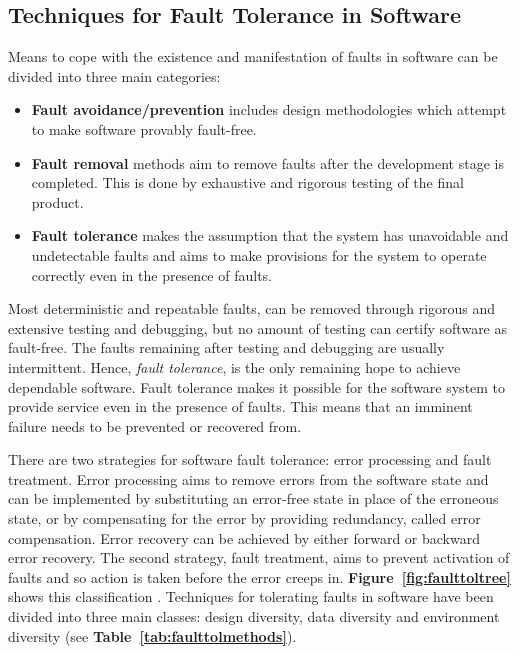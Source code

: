 \documentclass[a4paper, 11pt]{article}
\begin{document}
\subsection{Techniques for Fault Tolerance in Software}
Means to cope with the existence and manifestation of faults in software can be divided into three main categories:

\begin{itemize}
\item \textbf{Fault avoidance/prevention} includes design methodologies which attempt to make software provably fault-free.
\item \textbf{Fault removal} methods aim to remove faults after the development stage is completed. This is done by exhaustive and rigorous testing of the final product.
\item \textbf{Fault tolerance} makes the assumption that the system has unavoidable and undetectable faults and aims to make provisions for the system to operate correctly even in the presence of faults.
\end{itemize}

Most deterministic and repeatable faults, can be removed through rigorous and extensive testing and debugging, but no amount of testing can certify software as fault-free. The faults remaining after testing and debugging are usually intermittent. Hence, \emph{fault tolerance}, is the only remaining hope to achieve dependable software. Fault tolerance makes it possible for the software system to provide service even in the presence of faults. This means that an imminent failure needs to be prevented or recovered from.

There are two strategies for software fault tolerance: error processing and fault treatment. Error processing aims to remove errors from the software state and can be implemented by substituting an error-free state in place of the erroneous state, or by compensating for the error by providing redundancy, called error compensation. Error recovery can be achieved by either forward or backward error recovery. The second strategy, fault treatment, aims to prevent activation of faults and so action is taken before the error creeps in. \textbf{Figure~\ref{fig:faulttoltree}} shows this classification \citep{trivedi2008software}. Techniques for tolerating faults in software have been divided into three main classes: design diversity, data diversity and environment diversity (see \textbf{Table~\ref{tab:faulttolmethods}}).
\end{document}
